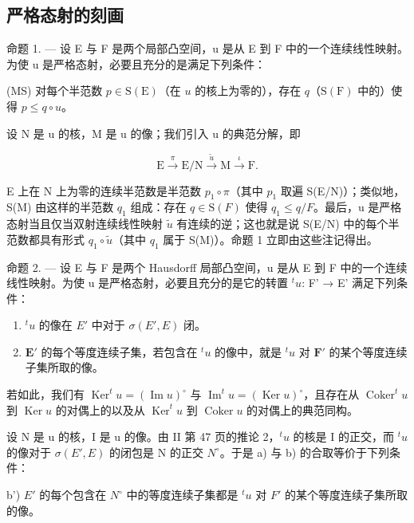 \subsection{严格态射的刻画}

命题 1. --- 设 E 与 F 是两个局部凸空间，u 是从 E 到 F 中的一个连续线性映射。为使 u 是严格态射，必要且充分的是满足下列条件：

(MS) 对每个半范数 \(p \in \mathrm{S}(\mathrm{E})\)（在 \(u\) 的核上为零的），存在 \(q\)（\(\mathrm{S}(\mathrm{F})\) 中的）使得 \(p \leqslant q \circ u\)。

设 N 是 u 的核，M 是 u 的像；我们引入 u 的典范分解，即

\[
\mathrm{E} \xrightarrow {\pi} \mathrm{E} / \mathrm{N} \xrightarrow {\tilde {u}} \mathrm{M} \xrightarrow {\iota} \mathrm{F}.
\]

E 上在 N 上为零的连续半范数是半范数 \(p_{1} \circ \pi\)（其中 \(p_{1}\) 取遍 S(E/N)）；类似地，S(M) 由这样的半范数 \(q_{1}\) 组成：存在 \(q \in \mathrm{S}(F)\) 使得 \(q_{1} \leqslant q/F\)。最后，u 是严格态射当且仅当双射连续线性映射 \(\tilde{u}\) 有连续的逆；这也就是说 S(E/N) 中的每个半范数都具有形式 \(q_{1} \circ \tilde{u}\)（其中 \(q_{1}\) 属于 S(M)）。命题 1 立即由这些注记得出。

命题 2. --- 设 E 与 F 是两个 Hausdorff 局部凸空间，u 是从 E 到 F 中的一个连续线性映射。为使 u 是严格态射，必要且充分的是它的转置 \({}^t u\): F' → E' 满足下列条件：

\begin{enumerate}
\def\labelenumi{\alph{enumi})}
\item
  \(^{t}u\) 的像在 \(E'\) 中对于 \(\sigma(E', E)\) 闭。
\item
  \(\mathbf{E}'\) 的每个等度连续子集，若包含在 \({}^t u\) 的像中，就是 \({}^t u\) 对 \(\mathbf{F}'\) 的某个等度连续子集所取的像。
\end{enumerate}

若如此，我们有 \(\operatorname{Ker}^t u = (\operatorname{Im} u)^\circ\) 与 \(\operatorname{Im}^t u = (\operatorname{Ker} u)^\circ\)，且存在从 \(\operatorname{Coker}^t u\) 到 \(\operatorname{Ker} u\) 的对偶上的以及从 \(\operatorname{Ker}^t u\) 到 \(\operatorname{Coker} u\) 的对偶上的典范同构。

设 N 是 u 的核，I 是 u 的像。由 II 第 47 页的推论 2，\(^{t}u\) 的核是 I 的正交，而 \(^{t}u\) 的像对于 \(\sigma(E', E)\) 的闭包是 N 的正交 \(N^{\circ}\)。于是 a) 与 b) 的合取等价于下列条件：

b') \(E'\) 的每个包含在 \(N^{\circ}\) 中的等度连续子集都是 \(^{t}u\) 对 \(F'\) 的某个等度连续子集所取的像。

